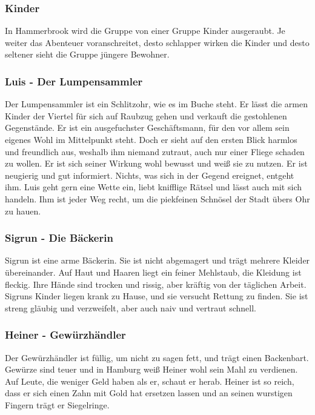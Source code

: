 \subsubsection*{Kinder}
\label{Kinder}

In Hammerbrook wird die Gruppe von einer Gruppe Kinder ausgeraubt. Je weiter das Abenteuer voranschreitet, desto schlapper wirken die Kinder und desto seltener sieht die Gruppe jüngere Bewohner.

\subsubsection*{Luis - Der Lumpensammler}
\label{Luis}

Der Lumpensammler ist ein Schlitzohr, wie es im Buche steht. Er lässt die armen Kinder der Viertel für sich auf Raubzug gehen und verkauft die gestohlenen Gegenstände. Er ist ein ausgefuchster Geschäftsmann, für den vor allem sein eigenes Wohl im Mittelpunkt steht. Doch er sieht auf den ersten Blick harmlos und freundlich aus, weshalb ihm niemand zutraut, auch nur einer Fliege schaden zu wollen. Er ist sich seiner Wirkung wohl bewusst und weiß sie zu nutzen. Er ist neugierig und gut informiert. Nichts, was sich in der Gegend ereignet, entgeht ihm. Luis geht gern eine Wette ein, liebt knifflige Rätsel und lässt auch mit sich handeln. Ihm ist jeder Weg recht, um die piekfeinen Schnösel der Stadt übers Ohr zu hauen.

\subsubsection*{Sigrun - Die Bäckerin}
\label{Sigrun}

Sigrun ist eine arme Bäckerin. Sie ist nicht abgemagert und trägt mehrere Kleider übereinander. Auf Haut und Haaren liegt ein feiner Mehlstaub, die Kleidung ist fleckig. Ihre Hände sind trocken und rissig, aber kräftig von der täglichen Arbeit. Sigruns Kinder liegen krank zu Hause, und sie versucht Rettung zu finden. Sie ist streng gläubig und verzweifelt, aber auch naiv und vertraut schnell.

\subsubsection*{Heiner - Gewürzhändler}
\label{Heiner}

Der Gewürzhändler ist füllig, um nicht zu sagen fett, und trägt einen Backenbart. Gewürze sind teuer und in Hamburg weiß Heiner wohl sein Mahl zu verdienen. Auf Leute, die weniger Geld haben als er, schaut er herab. Heiner ist so reich, dass er sich einen Zahn mit Gold hat ersetzen lassen und an seinen wurstigen Fingern trägt er Siegelringe.

